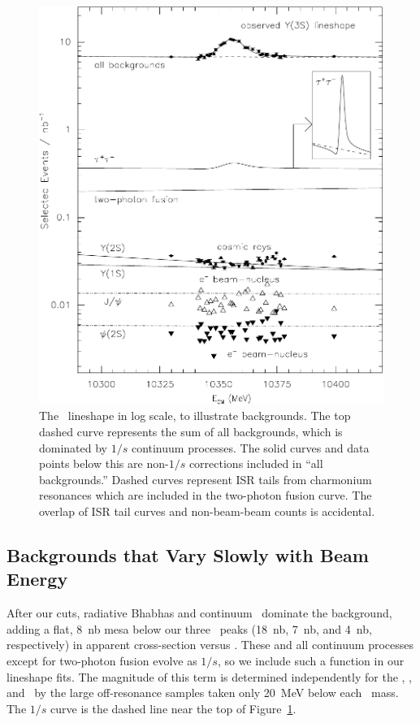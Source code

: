 \documentclass{cornell}
\begin{document}
\begin{figure}[p]
  \begin{center}
    \includegraphics[width=\linewidth]{plots/awesome}
  \end{center}
  \caption{\label{awesome} The \usss\ lineshape in log scale, to
  illustrate backgrounds.  The top dashed curve represents the sum of
  all backgrounds, which is dominated by $1/s$ continuum processes.
  The solid curves and data points below this are non-$1/s$
  corrections included in ``all backgrounds.''  Dashed curves
  represent ISR tails from charmonium resonances which are included in
  the two-photon fusion curve.  The overlap of ISR tail curves and
  non-beam-beam counts is accidental.}
\end{figure}

\subsection{Backgrounds that Vary Slowly with Beam Energy}
\label{sec:varyslowly}

After our cuts, radiative Bhabhas and continuum \qqbar\ dominate the
background, adding a flat, 8~nb mesa below our three \ups\ peaks
(18~nb, 7~nb, and 4~nb, respectively) in apparent cross-section versus
\ecm.  These and all continuum processes except for two-photon fusion
evolve as $1/s$, so we include such a function in our lineshape fits.
The magnitude of this term is determined independently for the \us,
\uss, and \usss\ by the large off-resonance samples taken only 20~MeV
below each \ups\ mass.  The $1/s$ curve is the dashed line near the top
of Figure~\ref{awesome}.
\end{document}
